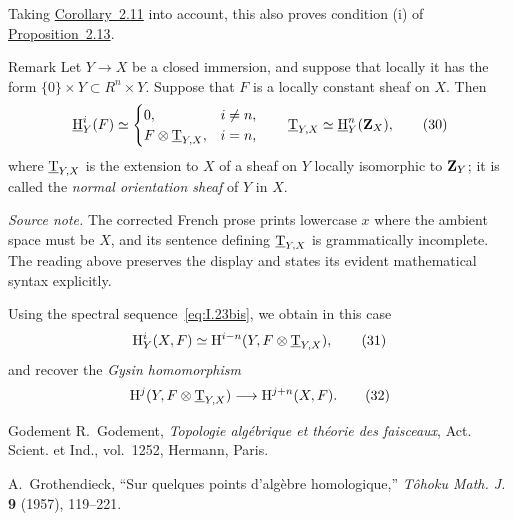 Taking \hyperref[I.2.11]{Corollary~2.11} into account, this also proves condition \textup{(i)}
of \hyperref[I.2.13]{Proposition~2.13}.

\begin{sgaremark}{Remark}
Let $Y\to X$ be a closed immersion, and suppose that locally it has the form
$\{0\}\times Y\subset R^n\times Y$. Suppose that $F$ is a locally constant
sheaf on $X$. Then
\begin{equation}
  \mathop{\underline{\mathrm H}}\nolimits_Y^i(F)\simeq
  \begin{cases}
    0,& i\ne n,\\
    F\otimes\underline{\mathrm T}_{Y,X},& i=n,
  \end{cases}
  \qquad
  \underline{\mathrm T}_{Y,X}\simeq\mathop{\underline{\mathrm H}}\nolimits_Y^n(\mathbf Z_X),
  \tag{30}\label{eq:I.30}
\end{equation}
where $\underline{\mathrm T}_{Y,X}$ is the extension to $X$ of a sheaf on $Y$ locally
isomorphic to $\mathbf Z_Y$; it is called the \emph{normal orientation sheaf} of
$Y$ in $X$.
\end{sgaremark}

\noindent\textit{Source note.} The corrected French prose prints lowercase
$x$ where the ambient space must be $X$, and its sentence defining
$\underline{\mathrm T}_{Y,X}$ is grammatically incomplete. The reading above preserves the
display and states its evident mathematical syntax explicitly.

Using the spectral sequence~\eqref{eq:I.23bis}, we obtain in this case
\begin{equation}
  \mathrm H_Y^i(X,F)
  \simeq
  \mathrm H^{i-n}(Y,F\otimes\underline{\mathrm T}_{Y,X}),
  \tag{31}\label{eq:I.31}
\end{equation}
and recover the \emph{Gysin homomorphism}
\begin{equation}
  \mathrm H^j(Y,F\otimes\underline{\mathrm T}_{Y,X})
  \longrightarrow
  \mathrm H^{j+n}(X,F).
  \tag{32}\label{eq:I.32}
\end{equation}

\begin{thebibliography}{Godement}
R.~Godement, \emph{Topologie alg\'ebrique et th\'eorie des faisceaux},
Act. Scient. et Ind., vol.~1252, Hermann, Paris.

A.~Grothendieck, ``Sur quelques points d'alg\`ebre homologique,''
\emph{T\^ohoku Math. J.} \textbf{9} (1957), 119--221.
\end{thebibliography}
